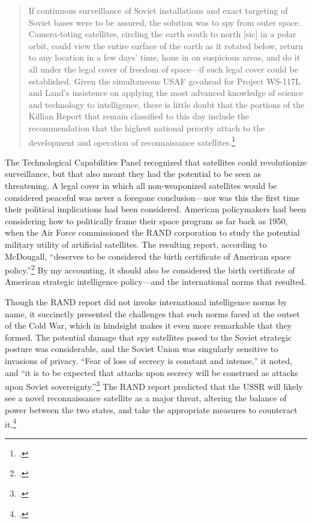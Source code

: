 \documentclass{report}
\begin{document}
\begin{quote}
	If continuous surveillance of Soviet installations and exact targeting of Soviet bases were to be assured, the solution was to spy from outer space. Camera-toting satellites, circling the earth south to north [sic] in a polar orbit, could view the entire surface of the earth as it rotated below, return to any location in a few days' time, hone in on suspicious areas, and do it all under the legal cover of freedom of space---if such legal cover could be established. Given the simultaneous USAF go-ahead for Project WS-117L and Land's insistence on applying the most advanced knowledge of science and technology to intelligence, there is little doubt that the portions of the Killian Report that remain classified to this day include the recommendation that the highest national priority attach to the development and operation of reconnaissance satellites.\footcite[p.~117]{mcdougall_heavens_1985}
\end{quote}

The Technological Capabilities Panel recognized that satellites could revolutionize surveillance, but that also meant they had the potential to be seen as threatening. A legal cover in which all non-weaponized satellites would be considered peaceful was never a foregone conclusion---nor was this the first time their political implications had been considered. American policymakers had been considering how to politically frame their space program as far back as 1950, when the Air Force commissioned the RAND corporation to study the potential military utility of artificial satellites. The resulting report, according to McDougall, ``deserves to be considered the birth certificate of American space policy.''\footcite[p.~108]{mcdougall_heavens_1985} By my accounting, it should also be considered the birth certificate of American strategic intelligence policy---and the international norms that resulted.

Though the RAND report did not invoke international intelligence norms by name, it succinctly presented the challenges that such norms faced at the outset of the Cold War, which in hindsight makes it even more remarkable that they formed. The potential damage that spy satellites posed to the Soviet strategic posture was considerable, and the Soviet Union was singularly sensitive to invasions of privacy. ``Fear of loss of secrecy is constant and intense,'' it noted, and ``it is to be expected that attacks upon secrecy will be construed as attacks upon Soviet sovereignty.''\footcite[p.~14]{kecskemetic_satellite_1950} The RAND report predicted that the USSR will likely see a novel reconnaissance satellite as a major threat, altering the balance of power between the two states, and take the appropriate measures to counteract it.\footcite[p.~13]{kecskemetic_satellite_1950}
\end{document}
